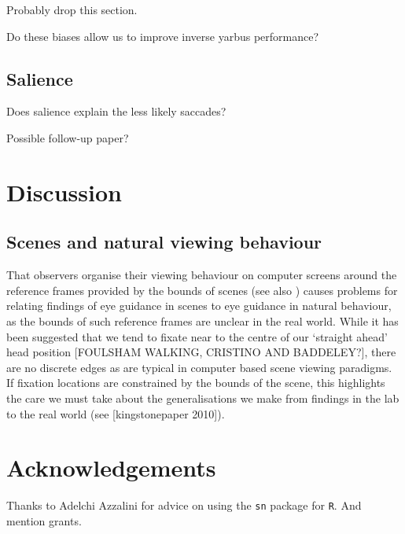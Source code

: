 \documentclass[a4paper, onecolumn, oneside, 11pt]{article}
\begin{document}
Probably drop this section.

Do these biases allow us to improve inverse yarbus performance?

\subsection{Salience}

Does salience explain the less likely saccades? 

Possible follow-up paper?

\section{Discussion}

\cite{}

\subsection{Scenes and natural viewing behaviour}
That observers organise their viewing behaviour on computer screens around the reference frames provided by the bounds of scenes (see also \cite{Stainer:2013ce}) causes problems for relating findings of eye guidance in scenes to eye guidance in natural behaviour, as the bounds of such reference frames are unclear in the real world. While it has been suggested that we tend to fixate near to the centre of our `straight ahead' head position [FOULSHAM WALKING, CRISTINO AND BADDELEY?], there are no discrete edges as are typical in computer based scene viewing paradigms. If fixation locations are constrained by the bounds of the scene, this highlights the care we must take about the generalisations we make from findings in the lab to the real world (see [kingstonepaper 2010]). 






\section*{Acknowledgements}

Thanks to Adelchi Azzalini for advice on using the \texttt{sn} package for \texttt{R}. And mention grants. 


\small

\end{document}
